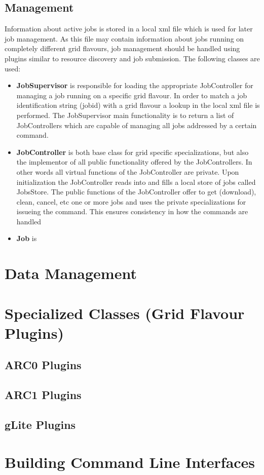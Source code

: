 \documentclass{book}
\begin{document}
\section{Management}
Information about active jobs is stored in a local xml file which is used for later job management. As this file may contain 
information about jobs running on completely different grid flavours, job management should be handled using plugins similar to 
resource discovery and job submission. The following classes are used:

\begin{itemize}
\item{{\bf JobSupervisor} is responsible for loading the appropriate JobController for managing a job running on a specific 
grid flavour. In order to match a job identification string (jobid) with a grid flavour a lookup in the local xml file is 
performed. The JobSupervisor main functionality is to return a list of JobControllers which are capable of managing all jobs 
addressed by a certain command.}

\item{{\bf JobController} is both base class for grid specific specializations, but also the implementor of all public functionality 
offered by the JobControllers. In other words all virtual functions of the JobController are private. Upon initialization the 
JobController reads into and fills a local store of jobs called JobsStore.
The public functions of the 
JobController offer to get (download), clean, cancel, etc one or more jobs and uses the private specializations for issueing the command. 
This ensures consistency in how the commands are handled }

\item{{\bf Job} is }
\end{itemize}

\chapter{Data Management}
\label{sec:DataManagement}

\chapter{Specialized Classes (Grid Flavour Plugins)}
\label{sec:plugins}
\section{ARC0 Plugins}
\section{ARC1 Plugins}
\section{gLite Plugins}

\chapter{Building Command Line Interfaces}
\label{sec:cli}


\end{document}
